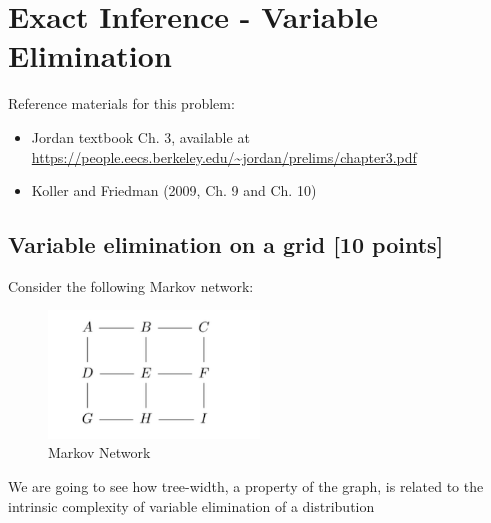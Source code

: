 \documentclass[a3paper,12pt]{extarticle} %
\begin{document}
\section{Exact Inference - Variable Elimination}

Reference materials for this problem:
\begin{itemize}
    \item Jordan textbook Ch. 3, available at \url{https://people.eecs.berkeley.edu/~jordan/prelims/chapter3.pdf}
    \item Koller and Friedman (2009, Ch. 9 and Ch. 10)
\end{itemize}

\subsection{Variable elimination on a grid [10 points]}
Consider the following Markov network:
\begin{figure}[h]
    \centering
    \includegraphics[width=0.5\textwidth]{bn4.png}
    \caption{Markov Network}
\end{figure}

We are going to see how tree-width, a property of the graph, is related to the intrinsic complexity of
variable elimination of a distribution
\end{document}

